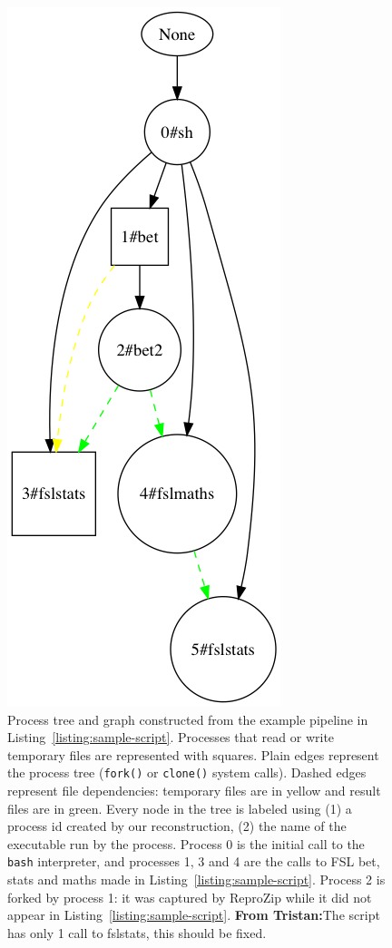 \documentclass[a4paper,num-refs]{oup-contemporary}
\newcommand{\reprozip}[0]{ReproZip\xspace}
\newcommand{\tristan}[1]{\color{blue}\textbf{From Tristan:}#1\color{black}}
\begin{document}
\begin{figure}
\centering
  \includegraphics[scale=0.25]{images/simple_graph}
  \caption{Process tree and graph
  constructed from the example pipeline in
  Listing~\ref{listing:sample-script}.
  Processes that read or write
  temporary files are 
  represented with squares. Plain edges 
  represent the process tree (\texttt{fork()} or \texttt{clone()} 
  system calls). Dashed edges represent file dependencies: temporary 
  files are in yellow and result files are in green.
  Every node in the tree is labeled using (1) a process id created by our
  reconstruction, (2) the name of the executable run by the process.
  Process 0 is the initial call to the \texttt{bash} interpreter, and
  processes 1, 3 and 4 are the calls to FSL bet, stats and maths made in
  Listing~\ref{listing:sample-script}. Process 2 is forked by process 1: it
  was captured by \reprozip while it did not appear in
  Listing~\ref{listing:sample-script}. \tristan{The script has only 1 call to fslstats, this should be fixed.}
}
  \label{fig:simple_script}
\end{figure}
\end{document}
